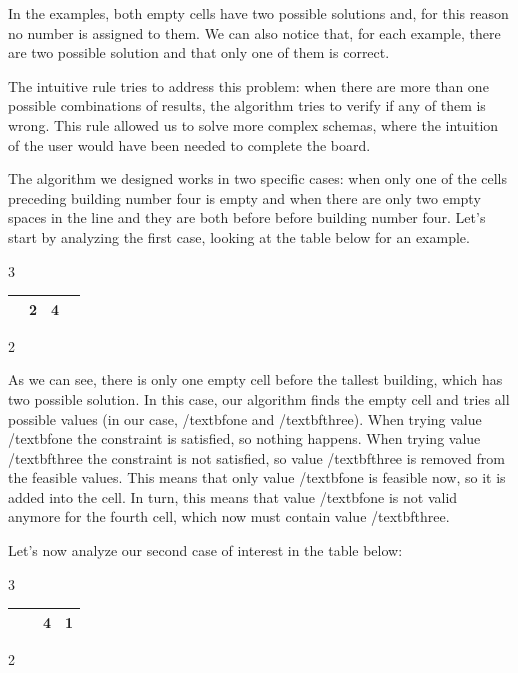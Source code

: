 \documentclass[12pt]{report}
\begin{document}
In the examples, both empty cells have two possible solutions and, for this
reason no number is assigned to them. We can also notice that, for each
example, there are two possible solution and that only one of them is
correct.

The intuitive rule tries to address this problem: when there are more than one
possible combinations of results, the algorithm tries to verify if any of them
is wrong. This rule allowed us to solve more complex schemas, where the intuition
of the user would have been needed to complete the board.

The algorithm we designed works in two specific cases: when only one of the
cells preceding building number four is empty and when there are only two empty
spaces in the line and they are both before before building number four. Let's
start by analyzing the first case, looking at the table below for an example.

\begin{center}
  3
  \begin{tabular}{| C{0.5cm} | C{0.5cm} | C{0.5cm} | C{0.5cm} |}
    \hline
    & 2 & 4 &  \tabularnewline \hline
  \end{tabular}
  2
\end{center}

As we can see, there is only one empty cell before the tallest building, which has
two possible solution. In this case, our algorithm finds the empty cell and tries
all possible values (in our case, /textbf{one} and /textbf{three}). When trying
value /textbf{one} the constraint is satisfied, so nothing happens. When trying
value /textbf{three} the constraint is not satisfied, so value /textbf{three} is
removed from the feasible values. This means that only value /textbf{one} is
feasible now, so it is added into the cell. In turn, this means that value /textbf{one}
is not valid anymore for the fourth cell, which now must contain value /textbf{three}.

Let's now analyze our second case of interest in the table below:

\begin{center}
  3
  \begin{tabular}{| C{0.5cm} | C{0.5cm} | C{0.5cm} | C{0.5cm} |}
    \hline
    &  & 4 & 1 \tabularnewline \hline
  \end{tabular}
  2
\end{center}
\end{document}
